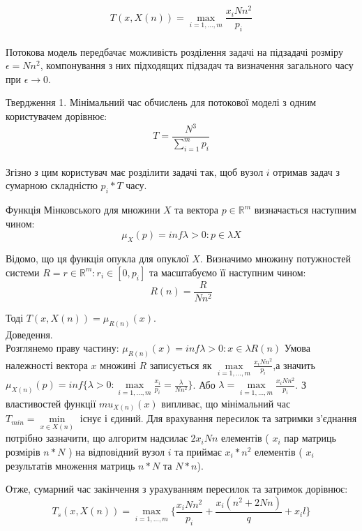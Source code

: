 \begin{equation}
	\label{eq:total_time_general}
	T(x,X(n)) = \max\limits_{i=1,\ldots,m}{\frac{x_i N n^2}{p_i}}
\end{equation}
\\
Потокова модель передбачає можливість розділення задачі на підзадачі розміру $\epsilon = N n^2$, компонування з них підходящих підзадач та визначення загального часу при  $\epsilon \longrightarrow 0$.

Твердження 1.
Мінімальний час обчислень для потокової моделі з одним користувачем дорівнює:
\begin{equation}
	\label{eq:lema1}
	T = \frac{N^{3}}{\sum_{i=1}^{m}p_i}
\end{equation}
\\
Згізно з цим користувач має розділити задачі так, щоб вузол $i$ отримав задач з сумарною складністю $p_i*T$ часу.

Функція Мінковського для множини $X$ та вектора $p \in \mathbb{R}^m$ визначається наступним чином:
\begin{equation}
	\mu_X(p) = inf {\lambda > 0 : p \in \lambda X}
\end{equation}

Відомо, що ця функція опукла для опуклої $X$.
Визначимо множину потужностей системи $R = {r \in \mathbb{R}^m : r_i \in [0, p_i]}$ та масштабуємо її наступним чином:
\begin{equation}
	R(n) = \frac{R}{Nn^2}
\end{equation}

Тоді $ T(x, X(n)) = \mu_{R(n)}(x) $.
\\
Доведення.
\\
Розглянемо праву частину: $\mu_{R(n)}(x) = inf {\lambda > 0 : x \in \lambda R(n)}$ Умова належності вектора $x$ множині $R$ записується як $\max\limits_{i=1,\ldots,m} \frac{x_i Nn^2}{p_i}$,а значить $\mu_{X(n)}(p) = inf \big\{ \lambda > 0 : \max\limits_{i=1,\ldots,m} \frac{x_i}{p_i} = \frac{\lambda}{Nn^2} \big\}$. Або $\lambda = \max\limits_{i=1,\ldots,m} \frac{x_i Nn^2}{p_i}$. З властивостей функції $mu_{X(n)}(x)$ випливає, що мінімальний час $T_{min} = \min\limits_{x \in X(n)} $ існує і єдиний. Для врахування пересилок та затримки з'єднання потрібно зазначити, що алгоритм надсилає $2x_iNn$ елементів ( $x_i$ пар матриць розмірів $n*N$ ) на відповідний вузол $i$ та приймає $x_i*n^2$ елементів ( $x_i$ результатів множення матриць $n*N$ та $N*n$).

Отже, сумарний час закінчення з урахуванням пересилок та затримок дорівнює:
\begin{equation}
	\label{eq:main_time}
	T_s(x,X(n)) = \max\limits_{i=1,\ldots,m} \bigg\{ \frac{x_i N n^2}{p_i} + \frac{x_i (n^2 + 2 N n )}{q} + x_i l \bigg\}
\end{equation}

